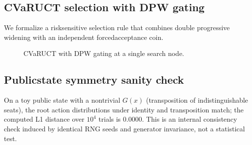 \subsection{CVaR\textendash UCT selection with DPW gating}
We formalize a risk\textendash sensitive selection rule that combines double progressive widening with an independent forced\textendash acceptance coin.

\begin{figure}[t]
\centering
{}
\caption{CVaR\textendash UCT with DPW gating at a single search node.}
\label{alg:cvar-uct-dpw}
\end{figure}

\subsection{Public\textendash state symmetry sanity check}
On a toy public state with a nontrivial $G(x)$ (transposition of indistinguishable seats), the root action distributions under identity and transposition match; the computed L1 distance over $10^4$ trials is 0.0000. This is an internal consistency check induced by identical RNG seeds and generator invariance, not a statistical test.

